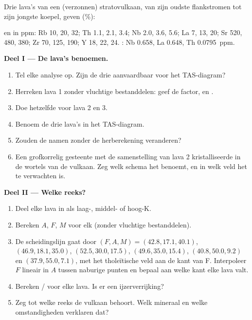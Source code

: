 \begin{problem}
\label{pb:b2:magmatic-series:1}
Drie lava's van een (verzonnen) stratovulkaan, van zijn oudste flankstromen tot zijn jongste
koepel, geven (\unit{\percent}):

\smallskip{}

\smallskip\noindent en in ppm: Rb 10, 20, 32; Th 1.1, 2.1, 3.4; Nb 2.0, 3.6, 5.6;
La 7, 13, 20; Sr 520, 480, 380; Zr 70, 125, 190; Y 18, 22, 24. : Nb
0.658, La 0.648, Th \qty{0.0795}{ppm}.

\noindent\textbf{Deel I --- De lava's benoemen.}
\begin{enumerate}
\item Tel elke analyse op. Zijn de drie aanvaardbaar voor het TAS-diagram?
\item Herreken lava 1 zonder vluchtige bestanddelen: geef de factor,  en
.
\item Doe hetzelfde voor lava 2 en 3.
\item Benoem de drie lava's in het TAS-diagram.
\item Zouden de namen zonder de herberekening veranderen?
\item Een grofkorrelig gesteente met de samenstelling van lava 2 kristalliseerde in de wortels van de
vulkaan. Zeg welk schema het benoemt, en in welk veld het te verwachten is.
\end{enumerate}

\noindent\textbf{Deel II --- Welke reeks?}
\begin{enumerate}[resume]
\item Deel elke lava in als laag-, middel- of hoog-K.
\item Bereken $A$, $F$, $M$ voor elk (zonder vluchtige bestanddelen).
\item De scheidingslijn gaat door $(F, A, M) = (42.8, 17.1, 40.1)$, $(46.9, 18.1,
35.0)$, $(52.5, 30.0, 17.5)$, $(49.6, 35.0, 15.4)$, $(40.8, 50.0, 9.2)$ en $(37.9,
55.0, 7.1)$, met het tholeïtische veld aan de kant van F. Interpoleer $F$ lineair in
$A$ tussen naburige punten en bepaal aan welke kant elke lava valt.
\item Bereken / voor elke lava. Is er een ijzerverrijking?
\item Zeg tot welke reeks de vulkaan behoort. Welk mineraal en welke omstandigheden
verklaren dat?
\end{enumerate}


\end{problem}
